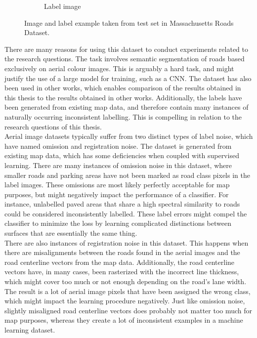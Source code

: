 \begin{figure}
\begin{subfigure}{0.48\textwidth}
\caption{Label image} \label{fig:mass_roads_example_label}
\end{subfigure}
\hspace*{\fill} %
\caption[Massachusetts Roads Dataset]{Image and label example taken from test set in Massachusetts Roads Dataset.} \label{fig:mass_roads_example}
\end{figure}


There are many reasons for using this dataset to conduct experiments related to the research questions.  The task involves semantic segmentation of roads based exclusively on aerial colour images. This is arguably a hard task, and might justify the use of a large model for training, such as a \ac{CNN}. The dataset has also been used in other works, which enables comparison of the results obtained in this thesis to the results obtained in other works. Additionally, the labels have been generated from existing map data, and therefore contain many instances of naturally occurring inconsistent labelling. This is compelling in relation to the research questions of this thesis.\\

Aerial image datasets typically suffer from two distinct types of label noise, which \cite{Mnih_aerial_images_noisy} have named omission and registration noise. The dataset is generated from existing map data, which has  some deficiencies when coupled with supervised learning. There are many instances of omission noise in this dataset, where smaller roads and parking areas have not been marked as road class pixels in the label images. These omissions are most likely perfectly acceptable for map purposes, but might negatively impact the performance of a classifier.  For instance, unlabelled paved areas that share a high spectral similarity to roads could be considered inconsistently labelled. These label errors might compel the classifier to minimize the loss by learning complicated distinctions between surfaces that are essentially the same thing.\\

There are also instances of registration noise in this dataset. This happens when there are misalignments between the roads found in the aerial images and the road centerline vectors from the map data. Additionally, the road centerline vectors have, in many cases, been rasterized with the incorrect line thickness, which might cover too much or not enough depending on the road's lane width. The result is a lot of aerial image pixels that have been assigned the wrong class, which might impact the learning procedure negatively. Just like omission noise, slightly misaligned road centerline vectors does  probably not matter too much for map purposes, whereas they create a lot of inconsistent examples in a machine learning dataset.


